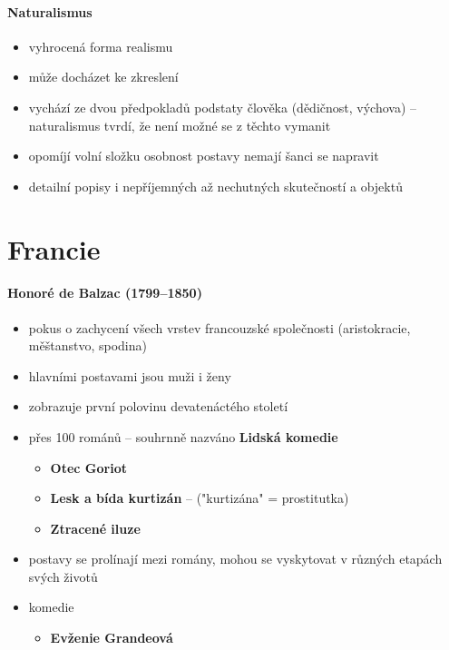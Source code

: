 \paragraph{Naturalismus}
\begin{itemize}
\item vyhrocená forma realismu
\item může docházet ke zkreslení
\item vychází ze dvou předpokladů podstaty člověka (dědičnost, výchova) -- naturalismus tvrdí, že není možné se z těchto vymanit
\item opomíjí volní složku osobnost \ra postavy nemají šanci se napravit
\item detailní popisy i nepříjemných až nechutných skutečností a objektů
\end{itemize}


\section{Francie}
\paragraph{Honoré de Balzac (1799--1850)}
\begin{itemize}
\item pokus o zachycení všech vrstev francouzské společnosti (aristokracie, měštanstvo, spodina)
\item hlavními postavami jsou muži i ženy
\item zobrazuje první polovinu devatenáctého století
\item přes 100 románů -- souhrnně nazváno \textbf{Lidská komedie}
	\begin{itemize}
	\item \textbf{Otec Goriot}
	\item \textbf{Lesk a bída kurtizán} -- ("kurtizána" = prostitutka)
	\item \textbf{Ztracené iluze}
	\end{itemize}
\item postavy se prolínají mezi romány, mohou se vyskytovat v různých etapách svých životů
\item komedie
	\begin{itemize}
	\item \textbf{Evženie Grandeová}
	\end{itemize}
\end{itemize}


